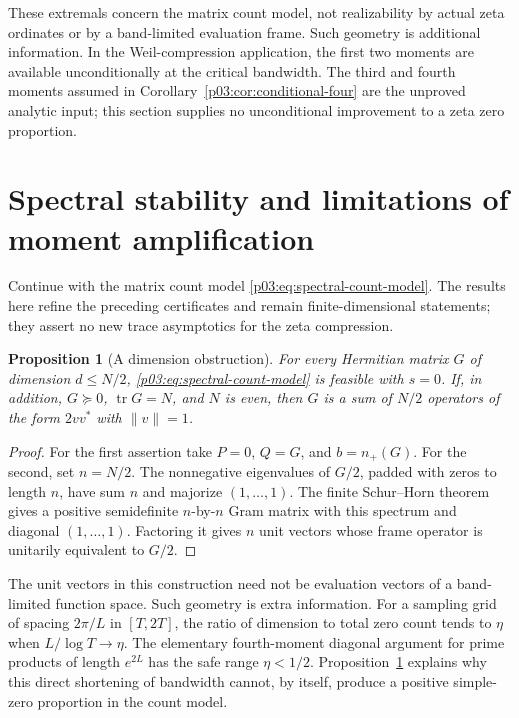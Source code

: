 \documentclass[11pt,letterpaper]{article}
\newtheorem{proposition}[theorem]{Proposition}
\theoremstyle{definition}
\theoremstyle{remark}
\newcommand{\1}{\mathbf 1}
\begin{document}
These extremals concern the matrix count model, not realizability by actual zeta ordinates or by a band-limited evaluation frame. Such geometry is additional information. In the Weil-compression application, the first two moments are available unconditionally at the critical bandwidth. The third and fourth moments assumed in Corollary~\ref{p03:cor:conditional-four} are the unproved analytic input; this section supplies no unconditional improvement to a zeta zero proportion.




\section{Spectral stability and limitations of moment amplification}
\label{p04:sec:spectral-frontier}

Continue with the matrix count model
\eqref{p03:eq:spectral-count-model}. The results here refine the
preceding certificates and remain finite-dimensional statements;
they assert no new trace asymptotics for the zeta compression.

\begin{proposition}[A dimension obstruction]\label{p04:prop:frontier-dimension}
For every Hermitian matrix $G$ of dimension $d\le N/2$,
\eqref{p03:eq:spectral-count-model} is feasible with $s=0$.
If, in addition, $G\succeq0$, $\operatorname{tr}G=N$, and $N$ is even,
then $G$ is a sum of $N/2$ operators of the form $2vv^*$ with
$\|v\|=1$.
\end{proposition}
\begin{proof}
For the first assertion take $P=0$, $Q=G$, and $b=n_+(G)$.
For the second, set $n=N/2$. The nonnegative eigenvalues of $G/2$,
padded with zeros to length $n$, have sum $n$ and majorize
$(1,\ldots,1)$. The finite Schur--Horn theorem gives a positive
semidefinite $n$-by-$n$ Gram matrix with this spectrum and diagonal
$(1,\ldots,1)$. Factoring it gives $n$ unit vectors whose frame
operator is unitarily equivalent to $G/2$.
\end{proof}

The unit vectors in this construction need not be evaluation vectors
of a band-limited function space. Such geometry is extra information.
For a sampling grid of spacing $2\pi/L$ in $[T,2T]$, the ratio of
dimension to total zero count tends to $\eta$ when
$L/\log T\to\eta$. The elementary fourth-moment diagonal argument
for prime products of length $e^{2L}$ has the safe range
$\eta<1/2$. Proposition~\ref{p04:prop:frontier-dimension} explains why
this direct shortening of bandwidth cannot, by itself, produce a
positive simple-zero proportion in the count model.
\end{document}

